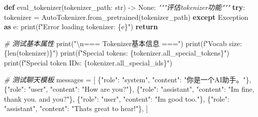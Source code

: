 \documentclass[
]{article}
\newenvironment{Shaded}{}{}
\newcommand{\BuiltInTok}[1]{\textcolor[rgb]{0.00,0.50,0.00}{#1}}
\newcommand{\CharTok}[1]{\textcolor[rgb]{0.25,0.44,0.63}{#1}}
\newcommand{\CommentTok}[1]{\textcolor[rgb]{0.38,0.63,0.69}{\textit{#1}}}
\newcommand{\ControlFlowTok}[1]{\textcolor[rgb]{0.00,0.44,0.13}{\textbf{#1}}}
\newcommand{\ImportTok}[1]{\textcolor[rgb]{0.00,0.50,0.00}{\textbf{#1}}}
\newcommand{\KeywordTok}[1]{\textcolor[rgb]{0.00,0.44,0.13}{\textbf{#1}}}
\newcommand{\NormalTok}[1]{#1}
\newcommand{\OperatorTok}[1]{\textcolor[rgb]{0.40,0.40,0.40}{#1}}
\newcommand{\PreprocessorTok}[1]{\textcolor[rgb]{0.74,0.48,0.00}{#1}}
\newcommand{\SpecialCharTok}[1]{\textcolor[rgb]{0.25,0.44,0.63}{#1}}
\newcommand{\SpecialStringTok}[1]{\textcolor[rgb]{0.73,0.40,0.53}{#1}}
\newcommand{\StringTok}[1]{\textcolor[rgb]{0.25,0.44,0.63}{#1}}
\newcommand{\VariableTok}[1]{\textcolor[rgb]{0.10,0.09,0.49}{#1}}
\begin{document}
\begin{Shaded}
\begin{Highlighting}[]
\KeywordTok{def}\NormalTok{ eval\_tokenizer(tokenizer\_path: }\BuiltInTok{str}\NormalTok{) }\OperatorTok{{-}\textgreater{}} \VariableTok{None}\NormalTok{:}
    \CommentTok{"""评估tokenizer功能"""}
    \ControlFlowTok{try}\NormalTok{:}
\NormalTok{        tokenizer }\OperatorTok{=}\NormalTok{ AutoTokenizer.from\_pretrained(tokenizer\_path)}
    \ControlFlowTok{except} \PreprocessorTok{Exception} \ImportTok{as}\NormalTok{ e:}
        \BuiltInTok{print}\NormalTok{(}\SpecialStringTok{f"Error loading tokenizer: }\SpecialCharTok{\{}\NormalTok{e}\SpecialCharTok{\}}\SpecialStringTok{"}\NormalTok{)}
        \ControlFlowTok{return}

    \CommentTok{\# 测试基本属性}
    \BuiltInTok{print}\NormalTok{(}\StringTok{"}\CharTok{\textbackslash{}n}\StringTok{=== Tokenizer基本信息 ==="}\NormalTok{)}
    \BuiltInTok{print}\NormalTok{(}\SpecialStringTok{f"Vocab size: }\SpecialCharTok{\{}\BuiltInTok{len}\NormalTok{(tokenizer)}\SpecialCharTok{\}}\SpecialStringTok{"}\NormalTok{)}
    \BuiltInTok{print}\NormalTok{(}\SpecialStringTok{f"Special tokens: }\SpecialCharTok{\{}\NormalTok{tokenizer}\SpecialCharTok{.}\NormalTok{all\_special\_tokens}\SpecialCharTok{\}}\SpecialStringTok{"}\NormalTok{)}
    \BuiltInTok{print}\NormalTok{(}\SpecialStringTok{f"Special token IDs: }\SpecialCharTok{\{}\NormalTok{tokenizer}\SpecialCharTok{.}\NormalTok{all\_special\_ids}\SpecialCharTok{\}}\SpecialStringTok{"}\NormalTok{)}

    \CommentTok{\# 测试聊天模板}
\NormalTok{    messages }\OperatorTok{=}\NormalTok{ [}
\NormalTok{        \{}\StringTok{"role"}\NormalTok{: }\StringTok{"system"}\NormalTok{, }\StringTok{"content"}\NormalTok{: }\StringTok{"你是一个AI助手。"}\NormalTok{\},}
\NormalTok{        \{}\StringTok{"role"}\NormalTok{: }\StringTok{"user"}\NormalTok{, }\StringTok{"content"}\NormalTok{: }\StringTok{"How are you?"}\NormalTok{\},}
\NormalTok{        \{}\StringTok{"role"}\NormalTok{: }\StringTok{"assistant"}\NormalTok{, }\StringTok{"content"}\NormalTok{: }\StringTok{"I\textquotesingle{}m fine, thank you. and you?"}\NormalTok{\},}
\NormalTok{        \{}\StringTok{"role"}\NormalTok{: }\StringTok{"user"}\NormalTok{, }\StringTok{"content"}\NormalTok{: }\StringTok{"I\textquotesingle{}m good too."}\NormalTok{\},}
\NormalTok{        \{}\StringTok{"role"}\NormalTok{: }\StringTok{"assistant"}\NormalTok{, }\StringTok{"content"}\NormalTok{: }\StringTok{"That\textquotesingle{}s great to hear!"}\NormalTok{\},}
\NormalTok{    ]}
    

\end{Highlighting}
\end{Shaded}
\end{document}
